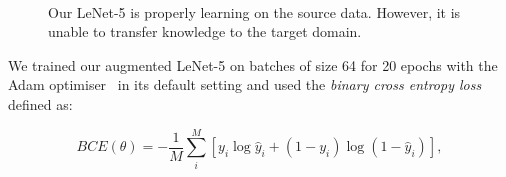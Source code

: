 \begin{figure}
\begin{center}
\\
\end{center}
\caption[Training progress of LeNet-5]{
	Our LeNet-5 is properly learning on the source data.
	However, it is unable to transfer knowledge to the target domain.
}
\label{lenet_losses}
\end{figure}

We trained our augmented LeNet-5 on batches of size 64 for 20 epochs with the Adam optimiser~\cite{kingma2014} in its default setting
and used the \textit{binary cross entropy loss} defined as:

\begin{equation}
	\mathit{BCE}(\theta) = -\frac{1}{M} \sum_i^M [y_i \log \hat{y}_i + (1 - y_i) \log(1 - \hat{y}_i)],
\end{equation}

